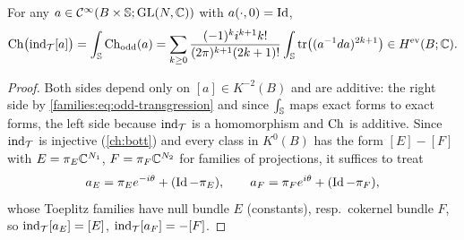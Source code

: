 \begin{proposition}\label{families:prop:toeplitz-chern}
  For any $a\in\mathcal{C}^\infty(B\times\mathbb{S};\operatorname{GL}(N,\mathbb{C}))$ with $a(\cdot,0)=\operatorname{Id}$,
  \begin{equation*}
    \operatorname{Ch}\bigl(\operatorname{ind}_{\mathcal T}[a]\bigr)=\int_{\mathbb{S}}\operatorname{Ch}_{\mathrm{odd}}(a)=\sum_{k\ge0}
    \frac{(-1)^ki^{k+1}k!}{(2\pi)^{k+1}(2k+1)!}\int_{\mathbb{S}}\operatorname{tr}\bigl((a^{-1}
    da)^{2k+1}\bigr)\in H^{\mathrm{ev}}(B;\mathbb{C}).
  \end{equation*}
\end{proposition}
\begin{proof}
  Both sides depend only on $[a]\in K^{-2}(B)$ and are additive: the right
  side by \eqref{families:eq:odd-transgression} and since $\int_{\mathbb{S}}$
  maps exact forms to exact forms, the left side because $\operatorname{ind}_{\mathcal T}$ is a
  homomorphism and $\operatorname{Ch}$ is additive. Since $\operatorname{ind}_{\mathcal T}$ is injective
  (\cref{ch:bott}) and every class in $K^0(B)$ has the form $[E]-[F]$ with
  $E=\pi_E\mathbb{C}^{N_1}$, $F=\pi_F\mathbb{C}^{N_2}$ for families of projections, it
  suffices to treat
  \begin{equation*}
    a_E=\pi_Ee^{-i\theta}+(\operatorname{Id}-\pi_E),\qquad a_F=\pi_Fe^{i\theta}+(\operatorname{Id}-\pi_F),
  \end{equation*}
  whose Toeplitz families have null bundle $E$ (constants), resp.\ cokernel
  bundle $F$, so $\operatorname{ind}_{\mathcal T}[a_E]=[E]$, $\operatorname{ind}_{\mathcal T}[a_F]=-[F]$.


\end{proof}
